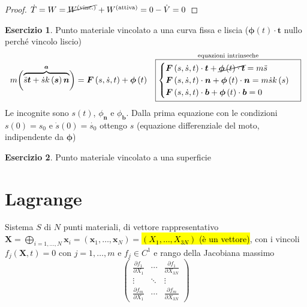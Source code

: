 \documentclass[a4paper,10pt]{article}
\providecommand{\exercisename}{Esercizio}
\theoremstyle{definition}
\newtheorem*{xca*}{\protect\exercisename}
\newcommand{\bv}{\boldsymbol} %
\theoremstyle{indentdefinition}
\theoremstyle{indenttheorem}
\theoremstyle{myremark}
\theoremstyle{indentgeneral}
\begin{document}
\begin{proof}
$\dot{T}=W=\cancel{W^{\text{(vinc.)}}}+W^{\text{(attiva)}}=0-\dot{V}=0$
\end{proof}
\begin{xca*}
Punto materiale vincolato a una curva fissa e liscia ($\boldsymbol{\phi}\left(t\right)\cdot\boldsymbol{t}$
nullo perché vincolo liscio)
\begin{align*}
m\overset{\boldsymbol{a}}{\left(\overbrace{\ddot{s}\boldsymbol{t}+\dot{s}k\left(\boldsymbol{s}\right)\boldsymbol{n}}\right)} & =\boldsymbol{F}\left(s,\dot{s},t\right)+\boldsymbol{\phi}\left(t\right) & \overset{\text{equazioni intrinseche}}{\boxed{\begin{cases}
\boldsymbol{F}\left(s,\dot{s},t\right)\cdot\boldsymbol{t}+\cancel{\boldsymbol{\phi}\left(t\right)\cdot\boldsymbol{t}}=m\ddot{s} & {\scriptscriptstyle }\\
\boldsymbol{F}\left(s,\dot{s},t\right)\cdot\boldsymbol{n}+\boldsymbol{\phi}\left(t\right)\cdot\boldsymbol{n}=m\dot{s}k\left(s\right)\\
\boldsymbol{F}\left(s,\dot{s},t\right)\cdot\boldsymbol{b}+\boldsymbol{\phi}\left(t\right)\cdot\boldsymbol{b}=0
\end{cases}}}
\end{align*}
Le incognite sono $s\left(t\right)$, $\phi_{\boldsymbol{n}}$ e $\phi_{\boldsymbol{b}}$.
Dalla prima equazione con le condizioni $s\left(0\right)=s_{0}$ e
$\dot{s}\left(0\right)=\dot{s_{0}}$ ottengo $s$ (equazione differenziale
del moto, indipendente da $\boldsymbol{\phi}$)
\end{xca*}
%
\begin{xca*}
Punto materiale vincolato a una superficie 
\end{xca*}
\pagebreak{}

\section{Lagrange}

Sistema $S$ di $N$ punti materiali, di vettore rappresentativo $\boldsymbol{X}=\bigoplus_{i=1,\ldots,N}\boldsymbol{x}_{i}=(\bv{x}_1,\dots,\bv{x}_N)=$\hl{$\left(X_{1},\dots,X_{3N}\right)$ (è un vettore)},
con i vincoli $f_{j}\left(\boldsymbol{X},t\right)=0$ con $j=1,\ldots,m$
e $f_{j}\in C^{1}$ e rango della Jacobiana massimo
\[
\begin{pmatrix}\frac{\partial f_{1}}{\partial X_{1}} & \cdots & \frac{\partial f_{1}}{\partial X_{3N}}\\
\vdots & \ddots & \vdots\\
\frac{\partial f_{m}}{\partial X_{1}} & \cdots & \frac{\partial f_{m}}{\partial X_{3N}}
\end{pmatrix}
\]
\end{document}
